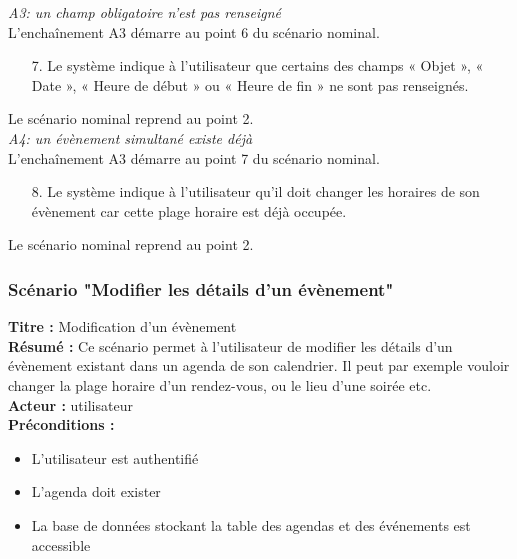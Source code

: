 \documentclass[12pt , a4paper]{article}
\begin{document}
\noindent\textit{A3: un champ obligatoire n'est pas renseigné}\\
L'encha\^inement A3 démarre au point 6 du scénario nominal.
\begin{enumerate}
\item[7.] Le système indique à l’utilisateur que certains des champs « Objet », « Date », « Heure de début » ou « Heure de fin » ne sont pas renseignés.
\end{enumerate}
Le scénario nominal reprend au point 2.\\


\noindent\textit{A4: un évènement simultané existe déjà}\\
L'encha\^inement A3 démarre au point 7 du scénario nominal.
\begin{enumerate}
\item[8.] Le système indique à l’utilisateur qu’il doit changer les horaires de son évènement car cette plage horaire est déjà occupée.
\end{enumerate}
Le scénario nominal reprend au point 2.\\


\newpage
\subsubsection{Scénario "Modifier les détails d'un évènement"}
\noindent\textbf{Titre : } Modification d’un évènement\\
\textbf{Résumé : } Ce scénario permet à l’utilisateur de modifier les détails d’un évènement existant dans un agenda de son calendrier. Il peut par exemple vouloir changer la plage horaire d’un rendez-vous, ou le lieu d’une soirée etc.\\
\textbf{Acteur : }utilisateur\\

\noindent\textbf{Préconditions :}
\begin{itemize}
\item L’utilisateur est authentifié
\item L'agenda doit exister
\item La base de données stockant la table des agendas et des événements est accessible\\
\end{itemize}
\end{document}
